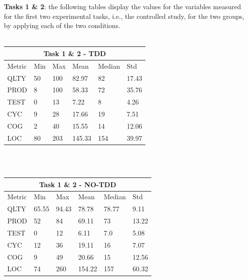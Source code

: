 \textbf{Tasks 1 \& 2}: the following tables display the values for the variables measured for the first two experimental tasks, i.e., the controlled study, for the two groups, by applying each of the two conditions.
\\ \  \\
\noindent
\begin{tabular}{ |p{2cm}||p{1.6cm}|p{1.6cm}|p{1.6cm}|p{1.6cm}|p{1.6cm}|}
    \hline
        \multicolumn{6}{|c|}{Task 1 \& 2 - TDD} \\
    \hline
        Metric & Min & Max & Mean & Median & Std\\
    \hline
        QLTY & 50 & 100 & 82.97 & 82 & 17.43 \\
        PROD & 8 & 100 & 58.33 & 72 & 35.76 \\
        TEST & 0 & 13 & 7.22 & 8 & 4.26 \\
        CYC & 9 & 28 & 17.66 & 19 & 7.51 \\
        COG & 2 & 40 & 15.55 & 14 & 12.06 \\
        LOC & 80 & 203 & 145.33 & 154 & 39.97 \\
    \hline
\end{tabular}
\\ \  \\
\noindent
\begin{tabular}{ |p{2cm}||p{1.6cm}|p{1.6cm}|p{1.6cm}|p{1.6cm}|p{1.6cm}|}
    \hline
        \multicolumn{6}{|c|}{Task 1 \& 2 - NO-TDD} \\
    \hline
        Metric & Min & Max & Mean & Median & Std\\
    \hline
        QLTY & 65.55 & 94.43 & 78.78 & 78.77 & 9.11 \\
        PROD & 52 & 84 & 69.11 & 73 & 13.22 \\
        TEST & 0 & 12 & 6.11 & 7.0 & 5.08 \\
        CYC & 12 & 36 & 19.11 & 16 & 7.07 \\
        COG & 9 & 49 & 20.66 & 15 & 12.56 \\
        LOC & 74 & 260 & 154.22 & 157 & 60.32 \\
    \hline
\end{tabular}
\\ \  \\
